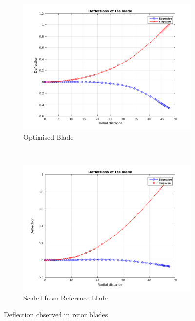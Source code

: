 \begin{figure}[H] 
\hspace*{-2.cm}
\centering
\begin{subfigure}{0.60\textwidth}
\includegraphics[width=\linewidth]{Images/deflection_optimal_no_correction.png} 
\caption{Optimised Blade}
\label{fig:deflection_optimal_1}
\end{subfigure}~
\begin{subfigure}{0.60\textwidth}
\includegraphics[width=\linewidth]{Images/deflection_scaled.png}
\caption{Scaled from Reference blade}
\label{fig:deflection_scaled}
\end{subfigure}
\caption{Deflection observed in rotor blades}
\label{fig:deflection}
\end{figure}


